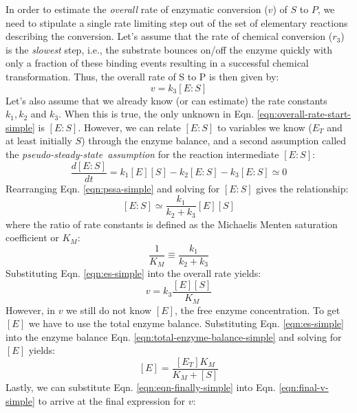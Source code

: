 \documentclass[11pt]{article}
\theoremstyle{definition}
\begin{document}
In order to estimate the \emph{overall} rate of enzymatic conversion ($v$) of $S$ to $P$, we need to stipulate a single rate limiting step out of the set of elementary reactions describing the conversion.
Let's assume that the rate of chemical conversion ($r_{3}$) is the \emph{slowest} step, i.e., the substrate bounces on/off the enzyme quickly with only a fraction of these binding events resulting
in a successful chemical transformation. Thus, the overall rate of S to P is then given by:
\begin{equation}\label{eqn:overall-rate-start-simple}
	v = k_{3}\left[E:S\right]
\end{equation}
Let's also assume that we already know (or can estimate) the rate constants $k_{1},k_{2}$ and $k_{3}$. When this is true, the only unknown in
Eqn. \eqref{eqn:overall-rate-start-simple} is $\left[E:S\right]$.
However, we can relate $\left[E:S\right]$ to variables we know ($E_{T}$ and at least initially $S$) through the enzyme balance,
and a second assumption called the \emph{pseudo-steady-state~assumption} for the reaction intermediate
$\left[E:S\right]$:
\begin{equation}\label{eqn:pssa-simple}
	\frac{d\left[E:S\right]}{dt} = k_{1}\left[E\right]\left[S\right] - k_{2}\left[E:S\right] - k_{3}\left[E:S\right]\simeq{0}
\end{equation}Rearranging Eqn. \eqref{eqn:pssa-simple} and solving for $\left[E:S\right]$ gives the relationship:
\begin{equation}\label{eqn:es-simple}
	\left[E:S\right]\simeq\frac{k_{1}}{k_{2}+k_{3}}\left[E\right]\left[S\right]
\end{equation}where the ratio of rate constants is defined as the Michaelis Menten saturation coefficient or $K_{M}$:
\begin{equation}
	\frac{1}{K_{M}}\equiv\frac{k_{1}}{k_{2}+k_{3}}
\end{equation}
Substituting Eqn. \eqref{eqn:es-simple} into the overall rate yields:
\begin{equation}\label{eqn:final-v-simple}
	v = k_{3}\frac{\left[E\right]\left[S\right]}{K_{M}}
\end{equation}However, in $v$ we still do not know $\left[E\right]$, the free enzyme concentration. To get $\left[E\right]$ we have to use the total enzyme balance.
Substituting Eqn. \eqref{eqn:es-simple} into the enzyme balance Eqn. \eqref{eqn:total-enzyme-balance-simple} and solving for $\left[E\right]$ yields:
\begin{equation}\label{eqn:eqn-finally-simple}
	\left[E\right] = \frac{\left[E_T\right]K_{M}}{K_{M}+\left[S\right]}
\end{equation}Lastly, we can substitute Eqn. \eqref{eqn:eqn-finally-simple} into Eqn. \eqref{eqn:final-v-simple} to arrive at the final expression for $v$:
\end{document}
